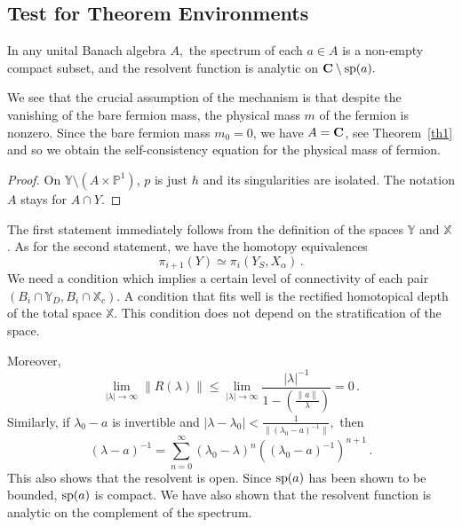 \documentclass{ws-rv9x6}
\begin{document}
\subsection*{Test for Theorem Environments}

\begin{theorem} \label{th1}
In any unital Banach algebra $A,$ the spectrum of each $a\in A$ is a
non-empty compact subset, and the resolvent 
function is analytic on ${\bf C} \setminus {\rm sp}(a).$
\end{theorem}

We see that the crucial assumption of the mechanism is that despite
the vanishing of the bare fermion mass, the physical mass $m$ of the
fermion is nonzero. Since the bare fermion mass $m_0=0$, we have
$A={\bf C}$, see Theorem~\ref{th1} and so we obtain the 
self-consistency equation for the physical mass of fermion.

\begin{proof}
On ${\mathbb Y}\setminus (A\times {\mathbb P}^1)$, $p$ is just 
$h$ and its singularities are isolated. The notation $A$ stays for 
$\hat A\cap Y$.
\end{proof}

The first statement immediately follows from the definition of the
spaces $\mathbb Y$ and $\mathbb X$. As for the second statement, we
have the homotopy equivalences
\begin{equation}	
\pi_{i +1} (Y)\simeq \pi_i (Y_S, X_\alpha)\,.
\label{eq:1}
\end{equation}
We need a condition which implies a certain level of connectivity of
each pair $(B_i\cap {\mathbb Y}_D, B_i\cap {\mathbb X}_c)$. A
condition that fits well is the rectified homotopical depth of the
total space $\mathbb X$. This condition does not depend on the
stratification of the space.

Moreover,
\begin{equation}\label{I1e1}
\lim_{|\lambda|\to\infty}\|R(\lambda)\|\le \lim_{|\lambda|\to\infty}
\frac{|\lambda|^{-1}}{1-( \frac{\|a\|}{\lambda})}=0\,.
\end{equation}
Similarly, 
if $\lambda_0-a$ is invertible and 
$|\lambda-\lambda_0| < \frac{1}{\|(\lambda_0-a)^{-1}\|} ,$ then 
\[
(\lambda-a)^{-1}=\sum_{n=0}^{\infty} (\lambda_0-\lambda)^n 
((\lambda_0-a)^{-1})^{n+1}\,.
\]
This also shows that the resolvent is open.  Since ${\rm sp}(a)$ has
been shown to be bounded, ${\rm sp}(a)$ is compact.  We have also
shown that the resolvent function is analytic on the complement of the
spectrum.
\end{document}
